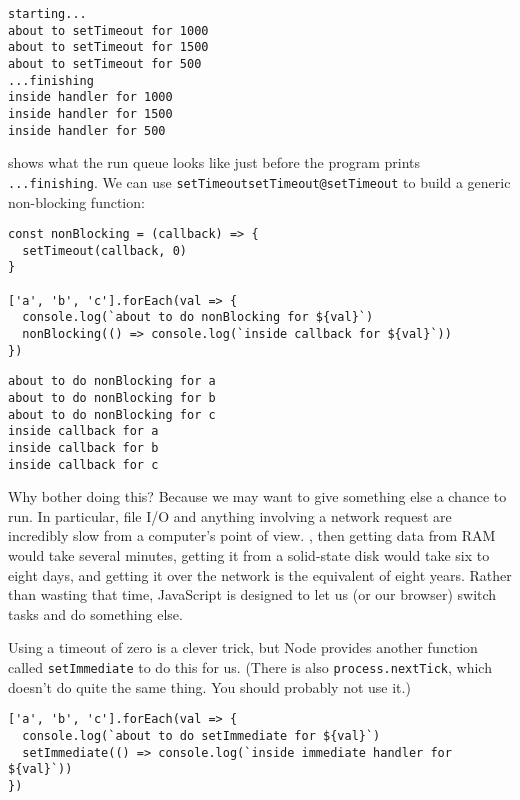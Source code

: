 \begin{verbatim}
starting...
about to setTimeout for 1000
about to setTimeout for 1500
about to setTimeout for 500
...finishing
inside handler for 1000
inside handler for 1500
inside handler for 500
\end{verbatim}


 shows what the run queue looks like just before the program prints \texttt{...finishing}.
We can use \texttt{setTimeout}\texttt{setTimeout@\texttt{setTimeout}}
to build a generic non-blocking function:

\begin{verbatim}
const nonBlocking = (callback) => {
  setTimeout(callback, 0)
}

['a', 'b', 'c'].forEach(val => {
  console.log(`about to do nonBlocking for ${val}`)
  nonBlocking(() => console.log(`inside callback for ${val}`))
})
\end{verbatim}

\begin{verbatim}
about to do nonBlocking for a
about to do nonBlocking for b
about to do nonBlocking for c
inside callback for a
inside callback for b
inside callback for c
\end{verbatim}

Why bother doing this?
Because we may want to give something else a chance to run.
In particular,
file I/O and anything involving a network request are incredibly slow from a computer's point of view.
,
then getting data from RAM would take several minutes,
getting it from a solid-state disk would take six to eight days,
and getting it over the network is the equivalent of eight years.
Rather than wasting that time,
JavaScript is designed to let us (or our browser) switch tasks and do something else.

Using a timeout of zero is a clever trick,
but Node provides another function called \texttt{setImmediate} to do this for us.
(There is also \texttt{process.nextTick},
which doesn't do quite the same thing.
You should probably not use it.)

\begin{verbatim}
['a', 'b', 'c'].forEach(val => {
  console.log(`about to do setImmediate for ${val}`)
  setImmediate(() => console.log(`inside immediate handler for ${val}`))
})
\end{verbatim}

